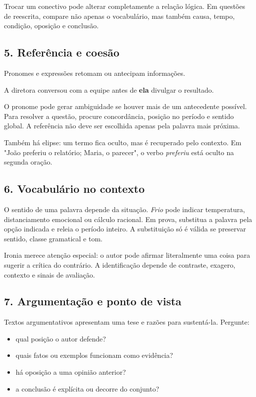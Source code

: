 \documentclass[11pt,a4paper]{article}
\begin{document}
Trocar um conectivo pode alterar completamente a relação lógica. Em questões de reescrita, compare não apenas o vocabulário, mas também causa, tempo, condição, oposição e conclusão.

\subsection*{5. Referência e coesão}

Pronomes e expressões retomam ou antecipam informações.

\begin{alerta}
A diretora conversou com a equipe antes de \textbf{ela} divulgar o resultado.
\end{alerta}

O pronome pode gerar ambiguidade se houver mais de um antecedente possível. Para resolver a questão, procure concordância, posição no período e sentido global. A referência não deve ser escolhida apenas pela palavra mais próxima.

Também há elipse: um termo fica oculto, mas é recuperado pelo contexto. Em "João preferiu o relatório; Maria, o parecer", o verbo \textit{preferiu} está oculto na segunda oração.

\subsection*{6. Vocabulário no contexto}

O sentido de uma palavra depende da situação. \textit{Frio} pode indicar temperatura, distanciamento emocional ou cálculo racional. Em prova, substitua a palavra pela opção indicada e releia o período inteiro. A substituição só é válida se preservar sentido, classe gramatical e tom.

Ironia merece atenção especial: o autor pode afirmar literalmente uma coisa para sugerir a crítica do contrário. A identificação depende de contraste, exagero, contexto e sinais de avaliação.

\subsection*{7. Argumentação e ponto de vista}

Textos argumentativos apresentam uma tese e razões para sustentá-la. Pergunte:

\begin{itemize}
  \item qual posição o autor defende?
  \item quais fatos ou exemplos funcionam como evidência?
  \item há oposição a uma opinião anterior?
  \item a conclusão é explícita ou decorre do conjunto?
\end{itemize}
\end{document}

